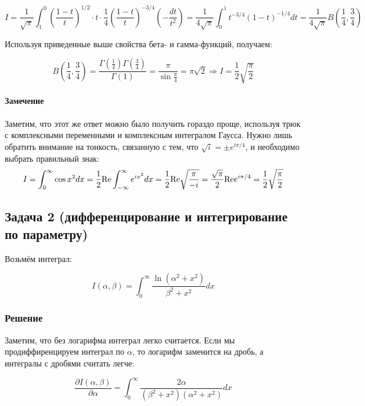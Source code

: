 \documentclass[a4paper,12pt]{article}
\begin{document}
\[
I=\frac{1}{\sqrt{\pi}}\int_{1}^{0}\left(\frac{1-t}{t}\right)^{1/2}\cdot t\cdot\frac{1}{4}\left(\frac{1-t}{t}\right)^{-3/4}\left(-\frac{dt}{t^{2}}\right)=\frac{1}{4\sqrt{\pi}}\int_{0}^{1}t^{-3/4}(1-t)^{-1/4}dt=\frac{1}{4\sqrt{\pi}}B\left(\frac{1}{4},\frac{3}{4}\right)
\]

\noindent
Используя приведенные выше свойства бета- и гамма-функций, получаем:

\[
B\left(\frac{1}{4},\frac{3}{4}\right)=\frac{\Gamma\left(\frac{1}{4}\right)\Gamma\left(\frac{3}{4}\right)}{\Gamma(1)}=\frac{\pi}{\sin\frac{\pi}{4}}=\pi\sqrt{2}\Rightarrow I=\frac{1}{2}\sqrt{\frac{\pi}{2}}
\]



\paragraph{Замечение }

Заметим, что этот же ответ можно было получить гораздо проще, используя
трюк с комплексными переменными и комплексным интегралом Гаусса. Нужно
лишь обратить внимание на тонкость, связанную с тем, что $\sqrt{i}=\pm e^{i\pi/4}$,
и необходимо выбрать правильный знак: 
\[
I=\int_{0}^{\infty}\cos x^{2}dx=\frac{1}{2}{\rm Re}\int_{-\infty}^{\infty}e^{ix^{2}}dx=\frac{1}{2}{\rm Re}\sqrt{\frac{\pi}{-i}}=\frac{\sqrt{\pi}}{2}{\rm Re}e^{i\pi/4}=\frac{1}{2}\sqrt{\frac{\pi}{2}}
\]



\subsection*{Задача 2 (дифференцирование и интегрирование по параметру)}

Возьмём интеграл:

\[
I(\alpha,\beta)=\int_{0}^{\infty}\frac{\ln(\alpha^{2}+x^{2})}{\beta^{2}+x^{2}}dx
\]



\subsubsection*{Решение}

Заметим, что без логарифма интеграл легко считается. Если мы продиффиренцируем
интеграл по $\alpha$, то логарифм заменится на дробь, а интегралы
с дробями считать легче:

\[
\frac{\partial I(\alpha,\beta)}{\partial\alpha}=\int_{0}^{\infty}\frac{2\alpha}{(\beta^{2}+x^{2})(\alpha^{2}+x^{2})}dx
\]
\end{document}
